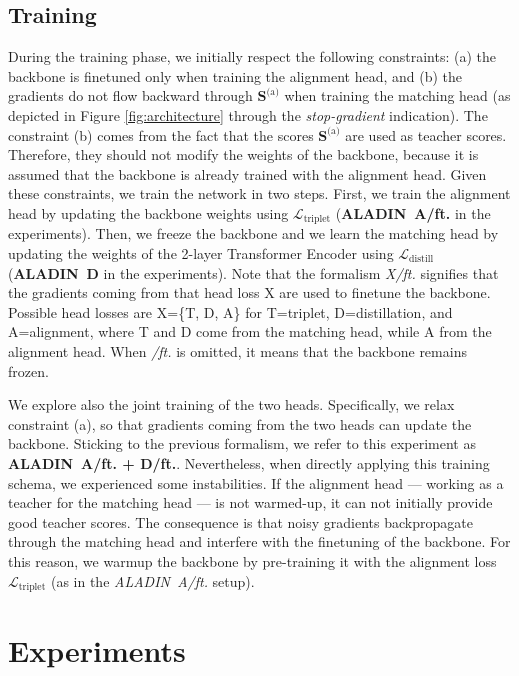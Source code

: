 \documentclass[sigconf]{acmart}
\newcommand{\ourmodel}{ALADIN}    \settopmatter{authorsperrow=4}
\begin{document}
\subsection{Training}
\label{sec:training}

During the training phase, we initially respect the following constraints: (a) the backbone is finetuned only when training the alignment head, and (b) the gradients do not flow backward through $\boldsymbol{S}^\text{(a)}$ when training the matching head (as depicted in Figure \ref{fig:architecture} through the \textit{stop-gradient} indication). The constraint (b) comes from the fact that the scores $\boldsymbol{S}^\text{(a)}$ are used as teacher scores. Therefore, they should not modify the weights of the backbone, because it is assumed that the backbone is already trained with the alignment head. Given these constraints, we train the network in two steps. First, we train the alignment head by updating the backbone weights using $\mathcal{L}_\text{triplet}$ (\textbf{\ourmodel\ A/ft.} in the experiments). Then, we freeze the backbone and we learn the matching head by updating the weights of the 2-layer Transformer Encoder using $\mathcal{L}_\text{distill}$ (\textbf{\ourmodel\ D} in the experiments). Note that the formalism \textit{X/ft.} signifies that the gradients coming from that head loss X are used to finetune the backbone. Possible head losses are X=\{T, D, A\} for T=triplet, D=distillation, and A=alignment, where T and D come from the matching head, while A from the alignment head. When \textit{/ft.} is omitted, it means that the backbone remains frozen.

We explore also the joint training of the two heads. Specifically, we relax constraint (a), so that gradients coming from the two heads can update the backbone. Sticking to the previous formalism, we refer to this experiment as \textbf{\ourmodel\ A/ft. + D/ft.}. Nevertheless, when directly applying this training schema, we experienced some instabilities. If the alignment head --- working as a teacher for the matching head --- is not warmed-up, it can not initially provide good teacher scores. The consequence is that noisy gradients backpropagate through the matching head and interfere with the finetuning of the backbone.
For this reason, we warmup the backbone by pre-training it with the alignment loss $\mathcal{L}_\text{triplet}$ (as in the \textit{\ourmodel\ A/ft.} setup).  \section{Experiments}
\label{sec:experiments}
\end{document}
